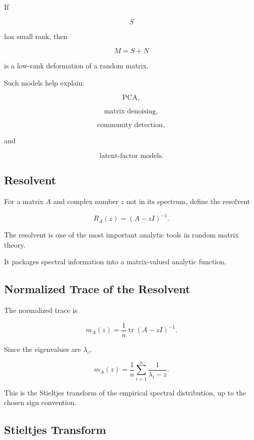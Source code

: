 If

\[
S
\]

has small rank, then

\[
M=S+N
\]

is a low-rank deformation of a random matrix.

Such models help explain:

\[
\text{PCA},
\]

\[
\text{matrix denoising},
\]

\[
\text{community detection},
\]

and

\[
\text{latent-factor models}.
\]

\subsection{Resolvent}
\label{subsec:resolvent-random-matrix}

For a matrix \(A\) and complex number \(z\) not in its spectrum, define
the resolvent

\[
\boxed{
R_A(z)
=
(A-zI)^{-1}.
}
\]

The resolvent is one of the most important analytic tools in random
matrix theory.

It packages spectral information into a matrix-valued analytic
function.

\subsection{Normalized Trace of the Resolvent}
\label{subsec:normalized-resolvent-trace}

The normalized trace is

\[
\boxed{
m_A(z)
=
\frac1n
\operatorname{tr}
(A-zI)^{-1}.
}
\]

Since the eigenvalues are \(\lambda_i\),

\[
\boxed{
m_A(z)
=
\frac1n
\sum_{i=1}^{n}
\frac1{\lambda_i-z}.
}
\]

This is the Stieltjes transform of the empirical spectral distribution,
up to the chosen sign convention.

\subsection{Stieltjes Transform}
\label{subsec:stieltjes-transform-rmt}

